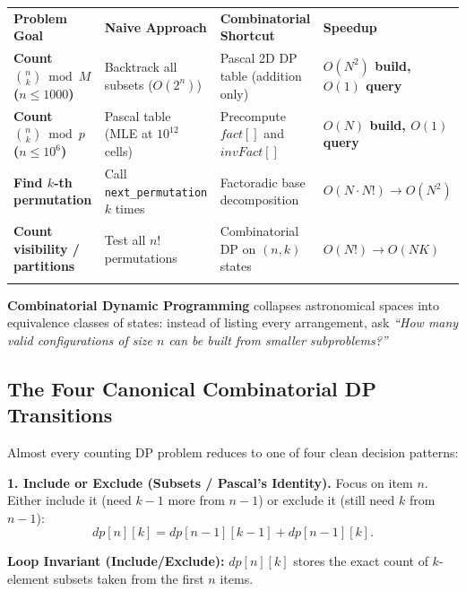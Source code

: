 \documentclass[11pt,a4paper]{article}
\theoremstyle{definition}
\newcommand{\invariantbeat}[1]{\par\noindent\textbf{\color{accentteal}Loop Invariant (#1):} }
\begin{document}
\begingroup\small{}
\begin{tabularx}{\textwidth}{>{\raggedright\arraybackslash\bfseries}p{3.6cm} >{\raggedright\arraybackslash}p{4.2cm} >{\raggedright\arraybackslash}X >{\raggedright\arraybackslash\bfseries}p{2.3cm}}
\arrayrulecolor{primaryblue}\toprule[1.2pt]
\rowcolor{primaryblue!10}
\textcolor{primaryblue}{\textbf{Problem Goal}} & \textcolor{primaryblue}{\textbf{Naive Approach}} & \textcolor{primaryblue}{\textbf{Combinatorial Shortcut}} & \textcolor{primaryblue}{\textbf{Speedup}} \\
\arrayrulecolor{codeframe}\midrule[0.6pt]
Count $\binom{n}{k} \bmod M$ ($n \le 1000$) & Backtrack all subsets ($O(2^n)$) & Pascal 2D DP table (addition only) & $O(N^2)$ build, $O(1)$ query \\
Count $\binom{n}{k} \bmod p$ ($n \le 10^6$) & Pascal table (MLE at $10^{12}$ cells) & Precompute $fact[]$ and $invFact[]$ & $O(N)$ build, $O(1)$ query \\
Find $k$-th permutation & Call \texttt{next\_permutation} $k$ times & Factoradic base decomposition & $O(N \cdot N!) \to O(N^2)$ \\
Count visibility / partitions & Test all $n!$ permutations & Combinatorial DP on $(n, k)$ states & $O(N!) \to O(NK)$ \\
\arrayrulecolor{primaryblue}\bottomrule[1.2pt]
\end{tabularx}\endgroup

\vspace{0.2cm}
\textbf{Combinatorial Dynamic Programming} collapses astronomical spaces into equivalence classes of states: instead of listing every arrangement, ask \emph{``How many valid configurations of size $n$ can be built from smaller subproblems?''}

\subsection{The Four Canonical Combinatorial DP Transitions}

Almost every counting DP problem reduces to one of four clean decision patterns:

\noindent\textbf{1. Include or Exclude (Subsets / Pascal's Identity).}
Focus on item $n$. Either include it (need $k - 1$ more from $n - 1$) or exclude it (still need $k$ from $n - 1$):
\[
    dp[n][k] = dp[n - 1][k - 1] + dp[n - 1][k].
\]
\invariantbeat{Include/Exclude} $dp[n][k]$ stores the exact count of $k$-element subsets taken from the first $n$ items.
\end{document}
